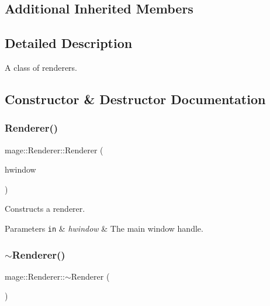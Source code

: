 \subsection*{Additional Inherited Members}


\subsection{Detailed Description}
A class of renderers. 

\subsection{Constructor \& Destructor Documentation}
\hypertarget{classmage_1_1_renderer_a762dcda433c319af237d1dfd9bc6095f}{}\label{classmage_1_1_renderer_a762dcda433c319af237d1dfd9bc6095f} 
\subsubsection{\texorpdfstring{Renderer()}{Renderer()}\hspace{0.1cm}{\footnotesize\ttfamily [1/2]}}
{\footnotesize\ttfamily mage\+::\+Renderer\+::\+Renderer (\begin{DoxyParamCaption}\item[{H\+W\+ND}]{hwindow }\end{DoxyParamCaption})}

Constructs a renderer.


\begin{DoxyParams}[1]{Parameters}
\mbox{\tt in}  & {\em hwindow} & The main window handle. \\
\hline
\end{DoxyParams}
\hypertarget{classmage_1_1_renderer_a997e041f28cc71d069d1ab7d29fe6ced}{}\label{classmage_1_1_renderer_a997e041f28cc71d069d1ab7d29fe6ced} 
\subsubsection{\texorpdfstring{$\sim$\+Renderer()}{~Renderer()}}
{\footnotesize\ttfamily mage\+::\+Renderer\+::$\sim$\+Renderer (\begin{DoxyParamCaption}{ }\end{DoxyParamCaption})\hspace{0.3cm}{\ttfamily [virtual]}}

